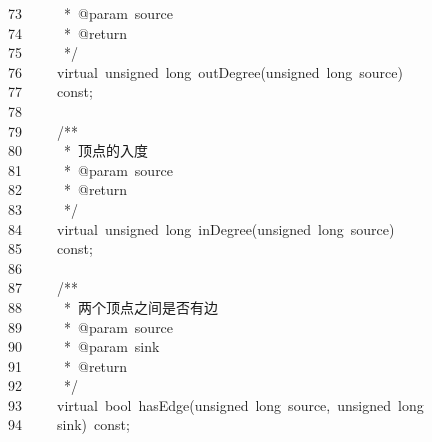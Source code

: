 \documentclass{ctexart}
\newcommand{\hlstd}[1]{\textcolor[rgb]{0.2,0.2,0.2}{#1}}
\newcommand{\hlcom}[1]{\textcolor[rgb]{0.59,0.59,0.59}{#1}}
\newcommand{\hlopt}[1]{\textcolor[rgb]{0.2,0.2,0.2}{#1}}
\newcommand{\hllin}[1]{\textcolor[rgb]{0.59,0.59,0.59}{#1}}
\newcommand{\hlkwb}[1]{\textcolor[rgb]{0.63,0,0.31}{#1}}
\newcommand{\hlkwc}[1]{\textcolor[rgb]{0,0.63,0.31}{#1}}
\newcommand{\hlkwd}[1]{\textcolor[rgb]{0.78,0.23,0.41}{#1}}
\begin{document}
\hllin{73\ }\hlcom{}\hlstd{\ \ \ \ \ }\hlcom{{*}\ @param\ source}\\
\hllin{74\ }\hlcom{}\hlstd{\ \ \ \ \ }\hlcom{{*}\ @return}\\
\hllin{75\ }\hlcom{}\hlstd{\ \ \ \ \ }\hlcom{{*}/}\hlstd{}\\
\hllin{76\ }\hlstd{}\hlstd{\ \ \ \ }\hlstd{}\hlkwc{virtual\ }\hlstd{}\hlkwb{unsigned\ long\ }\hlstd{}\hlkwd{outDegree}\hlstd{}\hlopt{(}\hlstd{}\hlkwb{unsigned\ long\ }\hlstd{source}\hlopt{)\ }\Righttorque\\
\hllin{77\ }\hlstd{}\hlstd{\ \ \ \ }\hlstd{}\hlkwb{const}\hlstd{}\hlopt{;}\\
\hllin{78\ }\hlstd{}\\
\hllin{79\ }\hlstd{}\hlstd{\ \ \ \ }\hlstd{}\hlcom{/{*}{*}}\\
\hllin{80\ }\hlcom{}\hlstd{\ \ \ \ \ }\hlcom{{*}\ 顶点的入度}\\
\hllin{81\ }\hlcom{}\hlstd{\ \ \ \ \ }\hlcom{{*}\ @param\ source}\\
\hllin{82\ }\hlcom{}\hlstd{\ \ \ \ \ }\hlcom{{*}\ @return}\\
\hllin{83\ }\hlcom{}\hlstd{\ \ \ \ \ }\hlcom{{*}/}\hlstd{}\\
\hllin{84\ }\hlstd{}\hlstd{\ \ \ \ }\hlstd{}\hlkwc{virtual\ }\hlstd{}\hlkwb{unsigned\ long\ }\hlstd{}\hlkwd{inDegree}\hlstd{}\hlopt{(}\hlstd{}\hlkwb{unsigned\ long\ }\hlstd{source}\hlopt{)\ }\Righttorque\\
\hllin{85\ }\hlstd{}\hlstd{\ \ \ \ }\hlstd{}\hlkwb{const}\hlstd{}\hlopt{;}\\
\hllin{86\ }\hlstd{}\\
\hllin{87\ }\hlstd{}\hlstd{\ \ \ \ }\hlstd{}\hlcom{/{*}{*}}\\
\hllin{88\ }\hlcom{}\hlstd{\ \ \ \ \ }\hlcom{{*}\ 两个顶点之间是否有边}\\
\hllin{89\ }\hlcom{}\hlstd{\ \ \ \ \ }\hlcom{{*}\ @param\ source}\\
\hllin{90\ }\hlcom{}\hlstd{\ \ \ \ \ }\hlcom{{*}\ @param\ sink}\\
\hllin{91\ }\hlcom{}\hlstd{\ \ \ \ \ }\hlcom{{*}\ @return}\\
\hllin{92\ }\hlcom{}\hlstd{\ \ \ \ \ }\hlcom{{*}/}\hlstd{}\\
\hllin{93\ }\hlstd{}\hlstd{\ \ \ \ }\hlstd{}\hlkwc{virtual\ }\hlstd{}\hlkwb{bool\ }\hlstd{}\hlkwd{hasEdge}\hlstd{}\hlopt{(}\hlstd{}\hlkwb{unsigned\ long\ }\hlstd{source}\hlopt{,\ }\hlstd{}\hlkwb{unsigned\ long\ }\Righttorque\\
\hllin{94\ }\hlstd{}\hlstd{\ \ \ \ }\hlstd{sink}\hlopt{)\ }\hlstd{}\hlkwb{const}\hlstd{}\hlopt{;}\\
\end{document}
